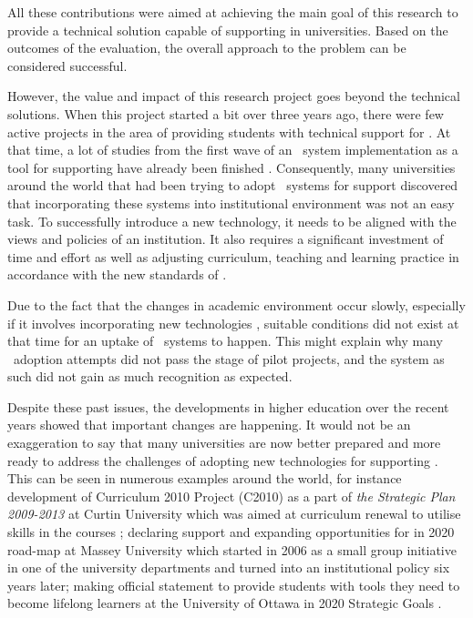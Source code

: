 All these contributions were aimed at achieving the main goal of this research
to provide a technical solution capable of supporting \LLLs in universities.
Based on the outcomes of the evaluation, the overall approach to the problem can
be considered successful.

However, the value and impact of this research project goes beyond the
technical solutions. When this project started a bit over three years ago,
there were few active projects in the area of providing students with technical
support for \LLLsn. At that time, a lot of studies from the first wave of an
\ep~system implementation as a tool for supporting \LLLs have already been
finished \citep{Batson2010}. Consequently, many universities around the world
that had been trying to adopt \ep~systems for \LLLs support discovered that
incorporating these systems into institutional environment was not an easy task.
To successfully introduce a new technology, it needs to be aligned with the
views and policies of an institution. It also requires a significant investment
of time and effort as well as adjusting curriculum, teaching and learning
practice in accordance with the new standards of \LLLsn.

Due to the fact that the changes in academic environment occur slowly,
especially if it involves incorporating new technologies \citep{Molebash1999},
suitable conditions did not exist at that time for an uptake of \ep~systems to
happen. This might explain why many \ep~adoption attempts did not pass the stage
of pilot projects, and the system as such did not gain as much recognition as
expected.

Despite these past issues, the developments in higher education over the recent
years showed that important changes are happening. It would not be an
exaggeration to say that many universities are now better prepared and more
ready to address the challenges of adopting new technologies for supporting
\LLLsn. This can be seen in numerous examples around the world, for instance
development of Curriculum 2010 Project (C2010) as a part of \textit{the
Strategic Plan 2009-2013} at Curtin University which was aimed at curriculum
renewal to utilise \LLLs skills in the courses \citep{Oliver2010}; declaring
support and expanding opportunities for \LLLs in 2020 road-map at Massey
University \citep{MasseyUniversity2012} which started in 2006 as a small group
initiative in one of the university departments and turned into an institutional
policy six years later; making official statement to provide students with tools
they need to become lifelong learners at the University of Ottawa in 2020
Strategic Goals \citep{UniversityofOttawa2011}.

